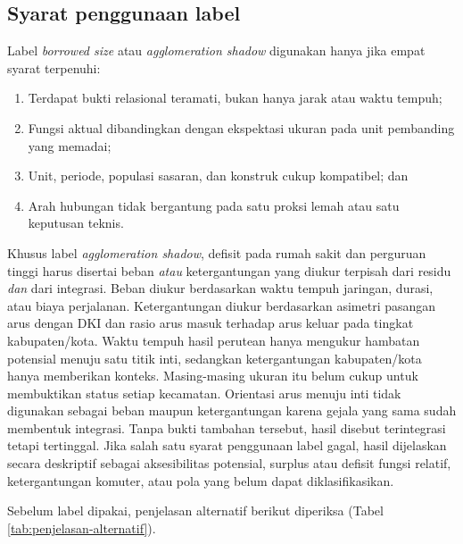 \documentclass[12pt,a4paper,oneside,openany,indonesian]{report}
\begin{document}
\subsection{Syarat penggunaan label}

Label \textit{borrowed size} atau \textit{agglomeration shadow} digunakan hanya jika empat syarat terpenuhi:

\begin{enumerate}
  \item Terdapat bukti relasional teramati, bukan hanya jarak atau waktu tempuh;
  \item Fungsi aktual dibandingkan dengan ekspektasi ukuran pada unit pembanding yang memadai;
  \item Unit, periode, populasi sasaran, dan konstruk cukup kompatibel; dan
  \item Arah hubungan tidak bergantung pada satu proksi lemah atau satu keputusan teknis.
\end{enumerate}

Khusus label \textit{agglomeration shadow}, defisit pada rumah sakit dan perguruan tinggi harus disertai beban \emph{atau} ketergantungan yang diukur terpisah dari residu \emph{dan} dari integrasi. Beban diukur berdasarkan waktu tempuh jaringan, durasi, atau biaya perjalanan. Ketergantungan diukur berdasarkan asimetri pasangan arus dengan DKI dan rasio arus masuk terhadap arus keluar pada tingkat kabupaten/kota. Waktu tempuh hasil perutean hanya mengukur hambatan potensial menuju satu titik inti, sedangkan ketergantungan kabupaten/kota hanya memberikan konteks. Masing-masing ukuran itu belum cukup untuk membuktikan status setiap kecamatan. Orientasi arus menuju inti tidak digunakan sebagai beban maupun ketergantungan karena gejala yang sama sudah membentuk integrasi. Tanpa bukti tambahan tersebut, hasil disebut terintegrasi tetapi tertinggal. Jika salah satu syarat penggunaan label gagal, hasil dijelaskan secara deskriptif sebagai aksesibilitas potensial, surplus atau defisit fungsi relatif, ketergantungan komuter, atau pola yang belum dapat diklasifikasikan.

Sebelum label dipakai, penjelasan alternatif berikut diperiksa (Tabel \ref{tab:penjelasan-alternatif}).
\end{document}
